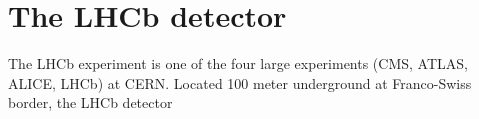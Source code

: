 \chapter{The LHCb detector}
\label{ref:detector}

The LHCb experiment is one of the four large experiments
(CMS, ATLAS, ALICE, LHCb) at CERN.
Located 100 meter underground at Franco-Swiss border,
the LHCb detector
